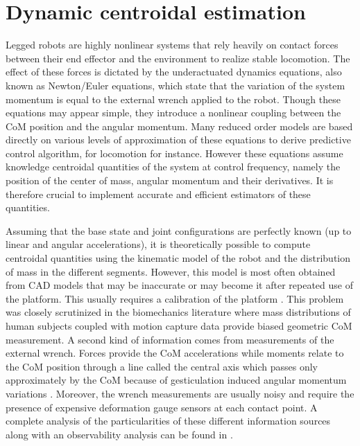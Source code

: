 \section{Dynamic centroidal estimation}
Legged robots are highly nonlinear systems that rely heavily on contact forces between their end effector and the environment to realize stable locomotion. 
The effect of these forces is dictated by the underactuated dynamics equations, also known as Newton/Euler equations, which state that the variation of the 
system momentum is equal to the external wrench applied to the robot. Though these equations may appear simple, they introduce a nonlinear coupling 
between the CoM position and the angular momentum. Many reduced order models are based directly on 
various levels of approximation of these equations \cite{kajita20013d, wieber2006trajectory, carpentier2016versatile} to derive predictive
control algorithm, for locomotion for instance. However these equations assume knowledge centroidal quantities of the system at control frequency, 
namely the position of the center of mass, angular momentum and their derivatives. It is therefore crucial to implement accurate and efficient estimators of these quantities.

Assuming that the base state and joint configurations are perfectly known (up to linear and angular accelerations), it is theoretically possible 
to compute centroidal quantities using the kinematic model of the robot and the distribution of mass in the different segments. 
However, this model is most often obtained from CAD models that may be inaccurate or may become it after repeated use of the platform. This usually requires a calibration of
the platform \cite{ayusawa2008identification, bonnet2019overview} . This problem was closely scrutinized in the biomechanics 
literature where mass distributions of human subjects coupled with 
motion capture data  provide biased geometric CoM measurement. A second kind of information comes from measurements of the external
wrench. Forces provide the CoM accelerations while moments relate to the CoM position through a line called the central axis which passes only approximately by
the CoM because of gesticulation induced angular momentum variations \cite{wieber2006holonomy}. Moreover, the wrench measurements are usually noisy
and require the presence of expensive deformation gauge sensors at each contact point. A complete analysis of the particularities
of these different information sources along with an observability analysis can be found in \cite{carpentier2016center}.

